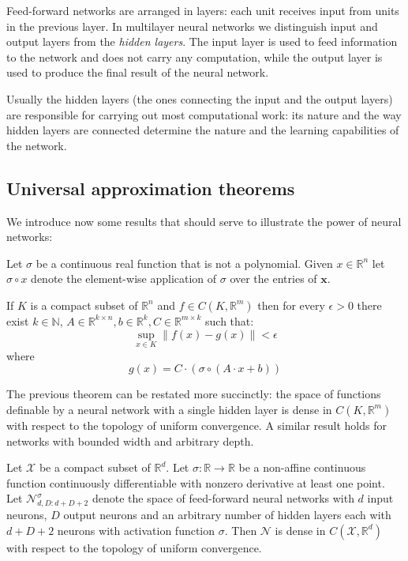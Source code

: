 Feed-forward networks are arranged in layers: each unit receives input from units in the previous layer. In multilayer neural networks we distinguish input and output layers from the \textit{hidden layers}. The input layer is used to feed information to the network and does not carry any computation, while the output layer is used to produce the final result of the neural network. 

Usually the hidden layers (the ones connecting the input and the output layers) are responsible for carrying out most computational work: its nature and the way hidden layers are connected determine the nature and the learning capabilities of the network. 

\subsection{Universal approximation theorems}
We introduce now some results that should serve to illustrate the power of neural networks: 

\begin{theorem}
Let \( \sigma \) be a continuous real function that is not a polynomial. Given \( x \in \mathbb{R}^n \) let \( \sigma \circ x \) denote the element-wise application of \( \sigma \) over the entries of \( \mathbf{x} \).

If \( K \) is a compact subset of \( \mathbb{R}^n \) and \( f \in C(K, \mathbb{R}^m) \) then for every \( \epsilon > 0 \) there exist \( k \in \mathbb{N} \), \( A \in \mathbb{R}^{k \times n},  b \in \mathbb{R}^k, C \in \mathbb{R}^{m \times k} \) such that:
\[ 
    \sup_{x \in K} \| {f(x) - g(x)} \| < \epsilon
\]
where
\[
    g(x) = C \cdot (\sigma \circ (A \cdot x  + b))
\]
\end{theorem}

The previous theorem can be restated more succinctly: the space of functions definable by a neural network with a single hidden layer is dense in \( C(K, \mathbb{R}^m) \) with respect to the topology of uniform convergence. A similar result holds for networks with bounded width and arbitrary depth.

\begin{theorem}
Let \( \mathcal{X} \) be a compact subset of \( \mathbb{R}^d \). Let \( \sigma: \mathbb{R} \to \mathbb{R} \) be a non-affine continuous function continuously differentiable with nonzero derivative at least one point. Let \( \mathcal{N}^\sigma_{d, D: d + D + 2} \) denote the space of feed-forward neural networks with \( d \) input neurons, \( D \) output neurons and an arbitrary number of hidden layers each with \( d + D + 2\) neurons with activation function \( \sigma \). Then \( \mathcal{N} \) is dense in \( C (\mathcal{X}, \mathbb{R}^d) \) with respect to the topology of uniform convergence.
\end{theorem}

